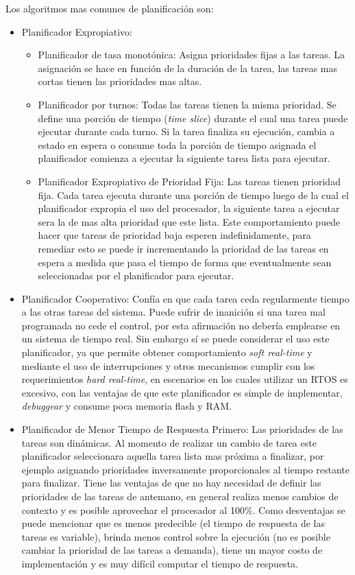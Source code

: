 \documentclass[withindex,glossary]{cam-thesis}
\begin{document}
Los algoritmos mas comunes de planificación son:
\begin{itemize}[topsep=-11pt, noitemsep]
  \item Planificador Expropiativo:
  	\begin{itemize}[topsep=-11pt, noitemsep]
  	  \item Planificador de tasa monotónica: Asigna prioridades fijas a las tareas. La asignación se hace en función de la duración de la tarea, las tareas mas cortas tienen las prioridades mas altas. 
      \item Planificador por turnos: Todas las tareas tienen la misma prioridad. Se define una porción de tiempo (\textit{time slice}) durante el cual una tarea puede ejecutar durante cada turno. Si la tarea finaliza su ejecución, cambia a estado en espera o consume toda la porción de tiempo asignada el planificador comienza a ejecutar la siguiente tarea lista para ejecutar.
      \item Planificador Expropiativo de Prioridad Fija: Las tareas tienen prioridad fija. Cada tarea ejecuta durante una porción de tiempo luego de la cual el planificador expropia el uso del procesador, la siguiente tarea a ejecutar sera la de mas alta prioridad que este lista. Este comportamiento puede hacer que tareas de prioridad baja esperen indefinidamente, para remediar esto se puede ir incrementando la prioridad de las tareas en espera a medida que pasa el tiempo de forma que eventualmente sean seleccionadas por el planificador para ejecutar.
  	\end{itemize}
  \item Planificador Cooperativo: Confía en que cada tarea ceda regularmente tiempo a las otras tareas del sistema. Puede sufrir de inanición si una tarea mal programada no cede el control, por esta afirmación no debería emplearse en un sistema de tiempo real. Sin embargo sí se puede considerar el uso este planificador, ya que permite obtener comportamiento \textit{soft real-time} y mediante el uso de interrupciones y otros mecanismos cumplir con los requerimientos \textit{hard real-time}, en escenarios en los cuales utilizar un RTOS es excesivo, con las ventajas de que este planificador es simple de implementar, \textit{debuggear} y consume poca memoria flash y RAM.
  \item Planificador de Menor Tiempo de Respuesta Primero: Las prioridades de las tareas son dinámicas. Al momento de realizar un cambio de tarea este planificador seleccionara aquella tarea lista mas próxima a finalizar, por ejemplo asignando prioridades inversamente proporcionales al tiempo restante para finalizar. Tiene las ventajas de que no hay necesidad de definir las prioridades de las tareas de antemano, en general realiza menos cambios de contexto y es posible aprovechar el procesador al 100\%. Como desventajas se puede mencionar que es menos predecible (el tiempo de respuesta de las tareas es variable), brinda menos control sobre la ejecución (no es posible cambiar la prioridad de las tareas a demanda), tiene un mayor costo de implementación y es muy difícil computar el tiempo de respuesta. \\[-7pt]
\end{itemize}
\end{document}
